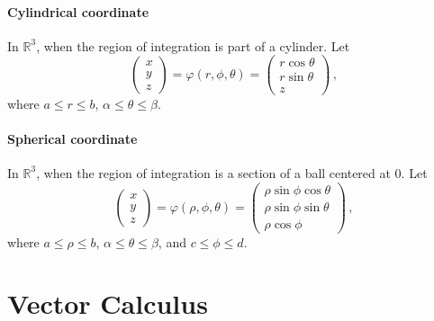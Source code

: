 \documentclass[
]{book}
\theoremstyle{definition}
\theoremstyle{definition}
\theoremstyle{definition}
\theoremstyle{definition}
\theoremstyle{remark}
\begin{document}
\hypertarget{cylindrical-coordinate}{%
\subsubsection{Cylindrical coordinate}\label{cylindrical-coordinate}}

In \(\mathbb{R}^3\), when the region of integration is part of a cylinder.
Let
\begin{equation*}
    \begin{pmatrix}
        x \\ y \\z
    \end{pmatrix}
    =
    \varphi(r,\phi,\theta) = 
    \begin{pmatrix}
        r\cos\theta\\
        r\sin\theta\\
        z
    \end{pmatrix} \,,
\end{equation*}
where \(a \leq r \leq b\), \(\alpha \leq \theta \leq \beta\).

\hypertarget{spherical-coordinate}{%
\subsubsection{Spherical coordinate}\label{spherical-coordinate}}

In \(\mathbb{R}^3\), when the region of integration is a section of a ball centered at \(0\).
Let
\begin{equation*}
    \begin{pmatrix}
        x \\ y \\z
    \end{pmatrix}
    =
    \varphi(\rho,\phi,\theta) = 
    \begin{pmatrix}
        \rho\sin\phi\cos\theta\\
        \rho\sin\phi\sin\theta\\
        \rho \cos\phi
    \end{pmatrix} \,,
\end{equation*}
where \(a \leq \rho \leq b\), \(\alpha \leq \theta \leq \beta\), and
\(c \leq \phi \leq d\).

\newpage

\hypertarget{vector-calculus}{%
\chapter{Vector Calculus}\label{vector-calculus}}
\end{document}
